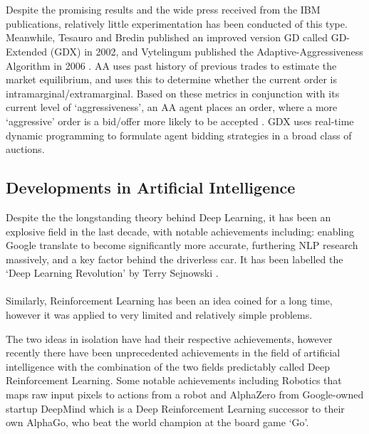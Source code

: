 \documentclass[ %
                    author={Ashwinder Khurana},
                supervisor={Prof Dave Cliff},
                    degree={MEng},
                     title={The Deeply Reinforced Trader},
                  subtitle={},
                      type={enterprise},
                      year={2020} ]{dissertation}
\begin{document}
\\
\\
Despite the promising results and the wide press received from the IBM publications, relatively little experimentation has been conducted of this type. Meanwhile, Tesauro and Bredin published an improved version GD called GD-Extended (GDX) in 2002, and Vytelingum published the Adaptive-Aggressiveness Algorithm in 2006 \cite{AA}. AA uses past history of previous trades to estimate the market equilibrium, and uses this to determine whether the current order is intramarginal/extramarginal. Based on these metrics in conjunction with its current level of \enquote*{aggressiveness}, an AA agent places an order, where a more \enquote*{aggressive} order is a bid/offer more likely to be accepted \cite{FinTech Lecture Slides}. GDX uses real-time dynamic programming to formulate agent bidding strategies in a broad class of auctions\cite{FinTech Lecture Slides}. 

\subsection{Developments in Artificial Intelligence}
\label{section:DevelopmentsAI}
Despite the the longstanding theory behind Deep Learning, it has been an explosive field in the last decade, with notable achievements including: enabling Google translate to become significantly more accurate, furthering NLP research massively, and a key factor behind the driverless car. It has been labelled the \enquote*{Deep Learning Revolution} by Terry Sejnowski \cite{Deep Learning Revolution}.
\\
\\
Similarly, Reinforcement Learning has been an idea coined for a long time\cite{RL-history}, however it was applied to very limited and relatively simple problems. 

The two ideas in isolation have had their respective achievements, however recently there have been unprecedented achievements in the field of artificial intelligence with the combination of the two fields predictably called Deep Reinforcement Learning. Some notable achievements including Robotics \cite{deep learning robots https://arxiv.org/abs/1504.00702} that maps raw input pixels to actions from a robot and AlphaZero from Google-owned startup DeepMind which is a Deep Reinforcement Learning successor to their own AlphaGo, who beat the world champion at the board game \enquote*{Go}. 
\end{document}
